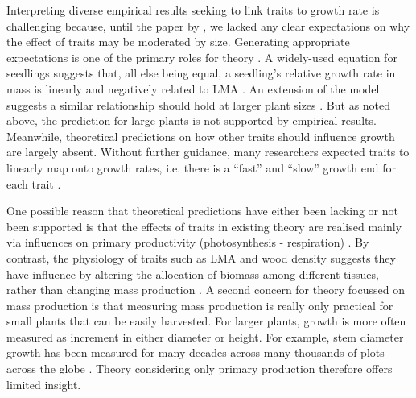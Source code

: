 \documentclass[a4paper,11pt]{article}
\begin{document}
Interpreting diverse empirical results seeking to link traits to growth rate is challenging because, until the paper by \citet{Gibert-2016}, we lacked any clear expectations on why the effect of traits may be moderated by size. Generating appropriate expectations is one of the primary roles for theory \citep{Kokko-2007}. A widely-used equation for seedlings suggests that, all else being equal, a seedling's relative growth rate in mass is linearly and negatively related to LMA \citep{Lambers-1992, Cornelissen-1996, Wright-2000}. An extension of the model suggests a similar relationship should hold at larger plant sizes \citep{Enquist-2007}. But as noted above, the prediction for large plants is not supported by empirical results. Meanwhile, theoretical predictions on how other traits should influence growth are largely absent. Without further guidance, many researchers expected traits to linearly map onto growth rates, i.e. there is a ``fast'' and ``slow'' growth end for each trait \citep[e.g.][]{Grime-1977, Poorter-2008, Chave-2009, Paine-2015}.

One possible reason that theoretical predictions have either been lacking or not been supported is that the effects of traits in existing theory are realised mainly via influences on primary productivity (photosynthesis - respiration) \citep{Wright-2000, Enquist-2007}. By contrast, the physiology of traits such as LMA and wood density suggests they have influence by altering the allocation of biomass among different tissues, rather than changing mass production \citep{Falster-2011, Duursma-2016, Gibert-2016}. A second concern for theory focussed on mass production is that measuring mass production is really only practical for small plants that can be easily harvested. For larger plants, growth is more often measured as increment in either diameter or height. For example, stem diameter growth has been measured for many decades across many thousands of plots across the globe \citep{Purves-2008, Anderson-2015, Kunstler-2016}. Theory considering only primary production therefore offers limited insight.
\end{document}

